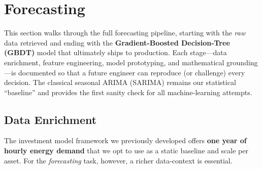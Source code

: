 \newpage
\section{Forecasting}
\label{sec:forecasting}

This section walks through the full forecasting pipeline, starting with the
\emph{raw} data retrieved and ending with the \textbf{Gradient-Boosted Decision-Tree 
(GBDT)} model that ultimately ships to production.  Each stage—data enrichment, 
feature engineering, model prototyping, and mathematical grounding—is documented 
so that a future engineer can reproduce (or challenge) every decision.  The 
classical seasonal ARIMA (SARIMA) remains our statistical “baseline” and provides 
the first sanity check for all machine-learning attempts.

\subsection{Data Enrichment}
\label{subsec:data-enrich}

The investment model framework we previously developed offers \textbf{one year of 
hourly energy demand} that we opt to use as a static baseline and scale per asset.  
For the \emph{forecasting} task, however, a richer data-context is
essential.

